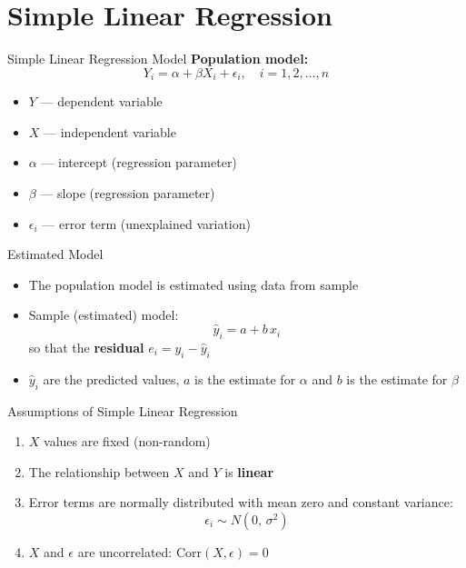 \documentclass[12pt, aspectratio=169]{beamer}
\begin{document}
    \section{Simple Linear Regression}

    \begin{frame}{Simple Linear Regression Model}
        \textbf{Population model:}
        \[
            Y_i = \alpha + \beta X_i + \epsilon_i, \quad i = 1, 2, \ldots, n
        \]
        \begin{itemize}
            \item $Y$ --- dependent variable
            \item $X$ --- independent variable
            \item $\alpha$ --- intercept (regression parameter)
            \item $\beta$ --- slope (regression parameter)
            \item $\epsilon_i$ --- error term (unexplained variation)
        \end{itemize}
    \end{frame}


    \begin{frame}{Estimated Model}
        \begin{itemize}
            \item The population model is estimated using data from sample
            \item Sample (estimated) model:
            \[
                \hat{y}_i = a + b\,x_i
            \]
            so that the \textbf{residual} $e_i = y_i - \hat{y}_i$
            \item \(\hat{y}_i\) are the predicted values, \(a\) is the estimate for \(\alpha\) and \(b\) is the estimate for \(\beta\)
        \end{itemize}
    \end{frame}


    \begin{frame}{Assumptions of Simple Linear Regression}
        \begin{enumerate}
            \item $X$ values are fixed (non-random)
            \item The relationship between $X$ and $Y$ is \textbf{linear}
            \item Error terms are normally distributed with mean zero and constant variance:
                \[
                    \epsilon_i \sim N(0,\,\sigma^2)
                \]
            \item $X$ and $\epsilon$ are uncorrelated:
                $\mathrm{Corr}(X, \epsilon) = 0$
        \end{enumerate}
    \end{frame}
\end{document}
